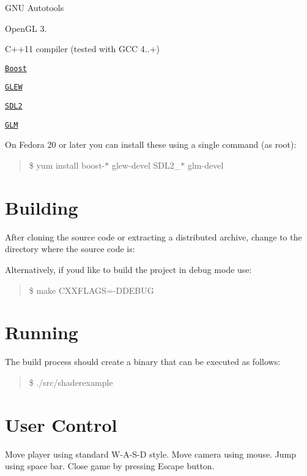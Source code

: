 
\begin{DoxyItemize}
\item G\+NU Autotools
\item Open\+GL 3.
\item C++11 compiler (tested with G\+CC 4..+)
\item \href{http://www.boost.org/}{\tt Boost}
\item \href{http://glew.sourceforge.net/}{\tt G\+L\+EW}
\item \href{https://www.libsdl.org/}{\tt S\+D\+L2}
\item \href{http://glm.g-truc.net/}{\tt G\+LM}
\end{DoxyItemize}

On Fedora 20 or later you can install these using a single command (as root)\+:

\begin{quote}
\$ yum install boost-\/$\ast$ glew-\/devel S\+D\+L2\+\_\+$\ast$ glm-\/devel \end{quote}


\section*{Building}

After cloning the source code or extracting a distributed archive, change to the directory where the source code is\+:




Alternatively, if you\textquotesingle{}d like to build the project in debug mode use\+:

\begin{quote}
\$ make C\+X\+X\+F\+L\+A\+GS=-\/\+D\+D\+E\+B\+UG \end{quote}


\section*{Running}

The build process should create a binary that can be executed as follows\+:

\begin{quote}
\$ ./src/shaderexample \end{quote}


\section*{User Control}

Move player using standard W-\/\+A-\/\+S-\/D style. Move camera using mouse. Jump using space bar. Close game by pressing Escape button. 